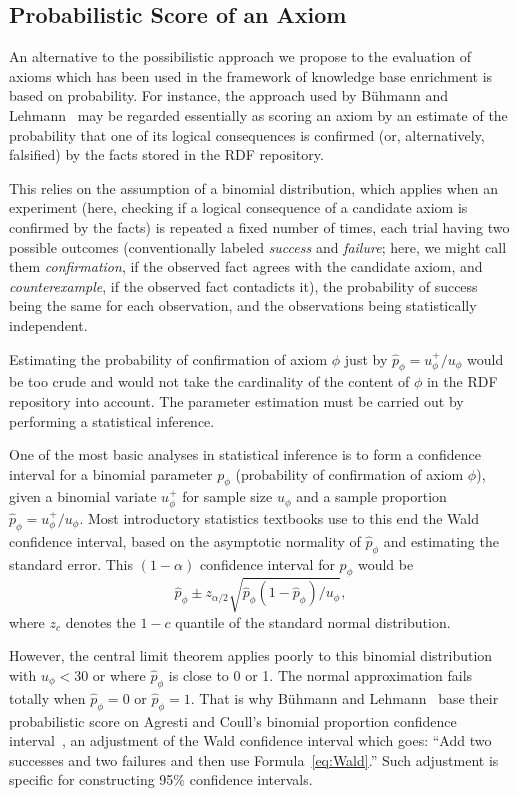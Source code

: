 \documentclass[a4paper]{article}
\newcounter{ex}
\begin{document}
\subsection{Probabilistic Score of an Axiom}

An alternative to the possibilistic approach we propose to the evaluation of axioms
which has been used in the framework of knowledge base enrichment is based on probability.
For instance, the approach used by B\"uhmann and Lehmann~\cite{BuehmannLehmann2012}
may be regarded essentially as scoring an axiom by an estimate of the probability
that one of its logical consequences is confirmed (or, alternatively, falsified)
by the facts stored in the RDF repository.

This relies on the assumption of a binomial distribution, which applies when an
experiment (here, checking if a logical consequence of a candidate axiom is confirmed
by the facts) is repeated a fixed number of times, each trial having two possible outcomes
(conventionally labeled \emph{success} and \emph{failure}; here, we might call them
\emph{confirmation}, if the observed fact agrees with the candidate axiom,
and \emph{counterexample}, if the observed fact contadicts it),
the probability of success being the same for each observation,
and the observations being statistically independent.

Estimating the probability of confirmation of axiom $\phi$ just by $\hat{p}_\phi = u_\phi^+/u_\phi$
would be too crude and would not take the cardinality of the content of $\phi$
in the RDF repository into account.
The parameter estimation must be carried out by performing a statistical inference.

One of the most basic analyses in statistical inference is to form a confidence interval
for a binomial parameter $p_\phi$ (probability of confirmation of axiom $\phi$), given
a binomial variate $u_\phi^+$ for sample size $u_\phi$ and a sample proportion $\hat{p}_\phi = u_\phi^+/u_\phi$.
Most introductory statistics textbooks use to this end the Wald confidence interval,
based on the asymptotic normality of $\hat{p}_\phi$ and estimating the standard error.
This $(1 - \alpha)$ confidence interval for $p_\phi$ would be
\begin{equation}\label{eq:Wald}
  \hat{p}_\phi \pm z_{\alpha/2}\sqrt{\hat{p}_\phi(1 - \hat{p}_\phi)/u_\phi},
\end{equation}
where $z_c$ denotes the $1 - c$ quantile of the standard normal distribution.

However, the central limit theorem applies poorly to this binomial distribution
with $u_\phi<30$ or where $\hat{p}_\phi$ is close to 0 or 1.
The normal approximation fails totally when $\hat{p}_\phi = 0$ or $\hat{p}_\phi = 1$.
That is why B\"uhmann and Lehmann~\cite{BuehmannLehmann2012} base their probabilistic score
on Agresti and Coull's binomial proportion confidence interval~\cite{AgrestiCoull1998},
an adjustment of the Wald confidence interval which goes: ``Add two successes and two failures
and then use Formula~\ref{eq:Wald}.'' Such adjustment is specific for constructing
95\% confidence intervals.
\end{document}
